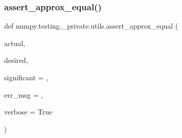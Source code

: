 \subsubsection{\texorpdfstring{assert\+\_\+approx\+\_\+equal()}{assert\_approx\_equal()}}
{\footnotesize\ttfamily def numpy.\+testing.\+\_\+private.\+utils.\+assert\+\_\+approx\+\_\+equal (\begin{DoxyParamCaption}\item[{}]{actual,  }\item[{}]{desired,  }\item[{}]{significant = {},  }\item[{}]{err\+\_\+msg = {\ttfamily \textquotesingle{}\textquotesingle{}},  }\item[{}]{verbose = {\ttfamily True} }\end{DoxyParamCaption})}

